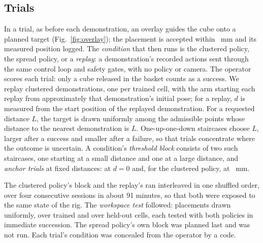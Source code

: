 \subsection{Trials}
In a trial, as before each demonstration, an overlay guides the cube onto a planned target (Fig.~\ref{fig:overlay}); the placement is accepted within \placementTolerance~mm and its measured position logged.
The \emph{condition} that then runs is the clustered policy, the spread policy, or a \emph{replay}: a demonstration's recorded actions sent through the same control loop and safety gates, with no policy or camera.
The operator scores each trial: only a cube released in the basket counts as a success.
We replay \nReplayDemosPlanned clustered demonstrations, one per trained cell, with the arm starting each replay from approximately that demonstration's initial pose; for a replay, $d$ is measured from the start position of the replayed demonstration.
For a requested distance $L$, the target is drawn uniformly among the admissible points whose distance to the nearest demonstration is $L$.
One-up-one-down staircases \cite{dixon1948method,levitt1971transformed} choose $L$, larger after a success and smaller after a failure, so that trials concentrate where the outcome is uncertain.
A condition's \emph{threshold block} consists of two such staircases, one starting at a small distance and one at a large distance, and \emph{anchor trials} at fixed distances: at $d=0$ and, for the clustered policy, at \farLevel~mm.

The clustered policy's block and the replay's ran interleaved in one shuffled order, over four consecutive sessions in about 91 minutes, so that both were exposed to the same state of the rig. %
The \emph{workspace test} followed: \nPairsPlanned placements drawn uniformly, \nPairsTrainedPlanned over trained and \nPairsHeldOutPlanned over held-out cells, each tested with both policies in immediate succession. The spread policy's own block was planned last and was not run. %
Each trial's condition was concealed from the operator by a code.

